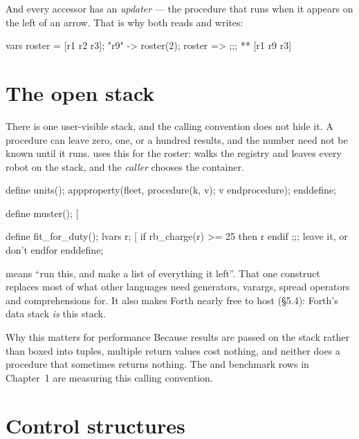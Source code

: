 And every accessor has an \emph{updater} --- the procedure that runs when it
appears on the left of an arrow. That is why  both reads and
writes:

\begin{pop}
vars roster = [r1 r2 r3];
"r9" -> roster(2);
roster =>                           ;;; ** [r1 r9 r3]
\end{pop}

\section{The open stack}

There is one user-visible stack, and the calling convention does not hide
it. A procedure can leave zero, one, or a hundred results, and the number
need not be known until it runs.  uses this for the roster:
 walks the registry and leaves every robot on the stack, and
the \emph{caller} chooses the container.

\begin{pop}
define units();
    appproperty(fleet, procedure(k, v); v endprocedure);
enddefine;

define muster();  [%

define fit_for_duty();
    lvars r;
    [%
           if rb_charge(r) >= 25 then r endif       ;;; leave it, or don't
       endfor %
enddefine;
\end{pop}

\code{[\%\ \ldots\ \%]} means ``run this, and make a list of everything it
left''. That one construct replaces most of what other languages need
generators, varargs, spread operators and comprehensions for. It also makes
Forth nearly free to host (\S5.4): Forth's data stack \emph{is} this stack.

\begin{callout}{Why this matters for performance}
Because results are passed on the stack rather than boxed into tuples,
multiple return values cost nothing, and neither does a procedure that
sometimes returns nothing. The  and  benchmark
rows in Chapter~1 are measuring this calling convention.
\end{callout}

\section{Control structures}

